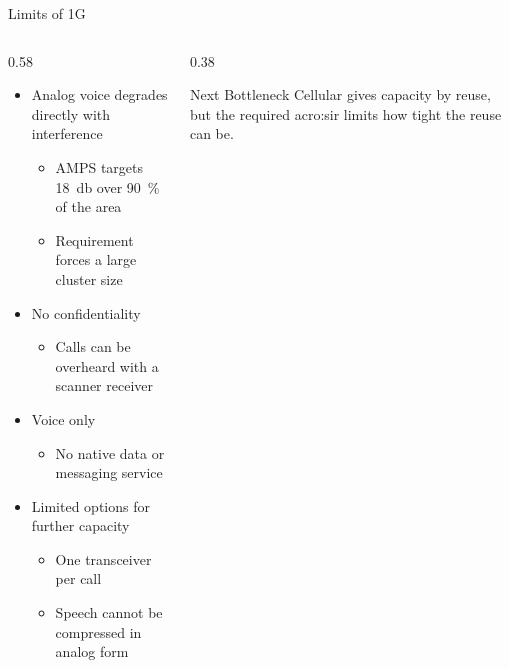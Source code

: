 \begin{frame}{Limits of 1G}
  \begin{columns}[T,onlytextwidth]
    \begin{column}{0.58\textwidth}
      \begin{itemize}
        \item Analog voice degrades directly with interference
          \begin{itemize}
            \item AMPS targets \qty{18}{\decibel} over \qty{90}{\percent} of the area
            \item Requirement forces a large cluster size
          \end{itemize}
        \item No confidentiality
          \begin{itemize}
            \item Calls can be overheard with a scanner receiver
          \end{itemize}
        \item Voice only
          \begin{itemize}
            \item No native data or messaging service
          \end{itemize}
        \item Limited options for further capacity
          \begin{itemize}
            \item One transceiver per call
            \item Speech cannot be compressed in analog form
          \end{itemize}
      \end{itemize}
    \end{column}
    \begin{column}{0.38\textwidth}
      \begin{block}{Next Bottleneck}
        \centering
        Cellular gives capacity by reuse, but the required \gls{acro:sir} limits how tight the reuse can be.
      \end{block}
    \end{column}
  \end{columns}
\end{frame}




